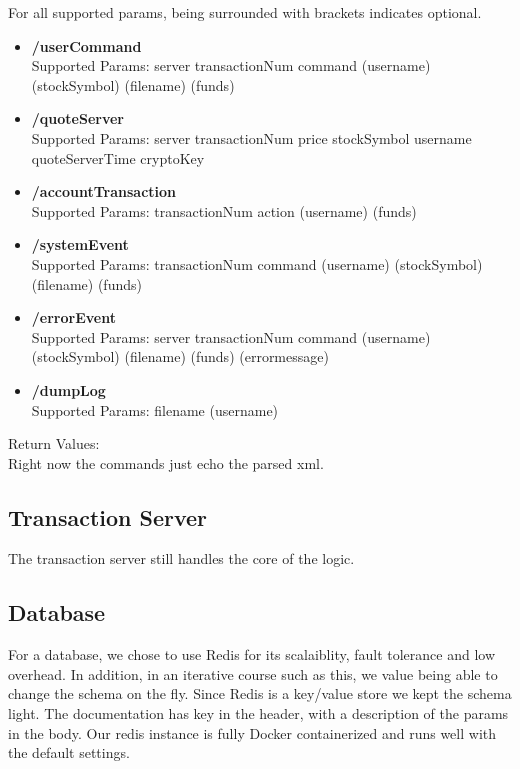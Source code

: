 \documentclass[a4paper,10pt]{article}
\begin{document}
For all supported params, being surrounded with brackets indicates optional.

\begin{itemize}
 \item \textbf{/userCommand}
\\Supported Params:
    server
    transactionNum
    command
    (username)
    (stockSymbol)
    (filename)
    (funds)

 \item \textbf{/quoteServer}
  \\Supported Params:
	 server
	 transactionNum
	 price
	 stockSymbol
	 username
	 quoteServerTime
	 cryptoKey

 \item \textbf{/accountTransaction}
  \\Supported Params:
	 transactionNum
	 action
	 (username)
	 (funds)

 \item \textbf{/systemEvent}
  \\Supported Params:
	 transactionNum
	 command
	 (username)
	 (stockSymbol)
	 (filename)
	 (funds)

 \item \textbf{/errorEvent}
  \\Supported Params:
	 server
	 transactionNum
	 command
	 (username)
	 (stockSymbol)
	 (filename)
	 (funds)
	 (errormessage)

 \item \textbf{/dumpLog}
  \\Supported Params:
	 filename
	 (username)
\end{itemize}

Return Values:
\\Right now the commands just echo the parsed xml.

\subsection{Transaction Server}
The transaction server still handles the core of the logic.

\subsection{Database}
For a database, we chose to use Redis for its scalaiblity, fault tolerance and 
low overhead. In addition, in an iterative course such as this, we value being 
able to change the schema on the fly. Since Redis is a key/value store we kept 
the schema light. The documentation has key in the header, with a description of 
the params in the body. Our redis instance is fully Docker containerized and 
runs well with the default settings.
\end{document}
